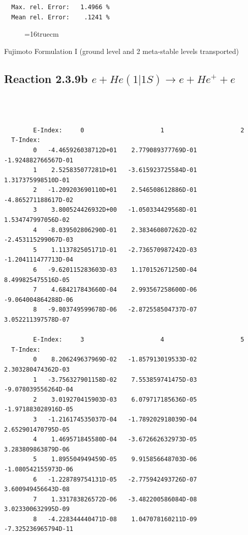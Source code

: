 \documentclass[12pt,dvips]{article}
\begin{document}
\begin{small}
\begin{verbatim}
  Max. rel. Error:   1.4966 %
  Mean rel. Error:    .1241 %

\end{verbatim}\end{small}
\begin{figure} \label{2.3.9a}
\epsfxsize=16truecm
\end{figure}
\newpage


 Fujimoto Formulation I (ground level and 2 meta-stable levels transported)

\subsection{
Reaction 2.3.9b  $e + He(1|1S) \rightarrow e + He^+ + e  $
}


\begin{small}\begin{verbatim}



        E-Index:     0                     1                     2
  T-Index:
        0   -4.465926038712D+01    2.779089377769D-01   -1.924882766567D-01
        1    2.525835077281D+01   -3.615923725584D-01    1.317375998510D-01
        2   -1.209203690110D+01    2.546508612886D-01   -4.865271188617D-02
        3    3.800524426932D+00   -1.050334429568D-01    1.534747997056D-02
        4   -8.039502806290D-01    2.383460807262D-02   -2.453115299067D-03
        5    1.113782505171D-01   -2.736570987242D-03   -1.204111477713D-04
        6   -9.620115283603D-03    1.170152671250D-04    8.499825475516D-05
        7    4.684217843660D-04    2.993567258600D-06   -9.064004864288D-06
        8   -9.803749599678D-06   -2.872558504737D-07    3.052211397578D-07

        E-Index:     3                     4                     5
  T-Index:
        0    8.206249637969D-02   -1.857913019533D-02    2.303280474362D-03
        1   -3.756327901158D-02    7.553859741475D-03   -9.078039556264D-04
        2    3.019270415903D-03    6.079717185636D-05   -1.971883028916D-05
        3   -1.216174535037D-04   -1.789202918039D-04    2.652901470795D-05
        4    1.469571845580D-04   -3.672662632973D-05    3.283809863879D-06
        5    1.895504949459D-05    9.915856648703D-06   -1.080542155973D-06
        6   -1.228789754131D-05   -2.775942493726D-07    3.600949456643D-08
        7    1.331783826572D-06   -3.482200586084D-08    3.023300632995D-09
        8   -4.228344440471D-08    1.047078160211D-09   -7.325236965794D-11


\end{verbatim}
\end{small}
\end{document}
